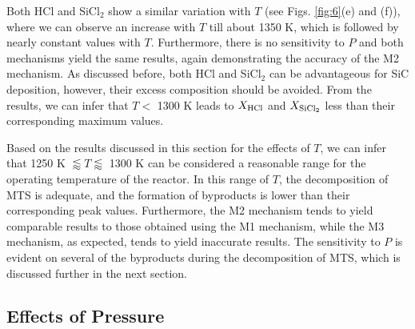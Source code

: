 \documentclass[final, letterpaper, square, comma, numbers, sort&compress]{elsarticle}
\begin{document}
Both HCl and SiCl$_2$ show a similar variation with $T$ (see Figs. \ref{fig:6}(e) and (f)), where we can observe an increase with $T$ till about 1350 K, which is followed by nearly constant values with $T$. Furthermore, there is no sensitivity to $P$ and both mechanisms yield the same results, again demonstrating the accuracy of the M2 mechanism. As discussed before, both HCl and SiCl$_2$ can be advantageous for SiC deposition, however, their excess composition should be avoided. From the results, we can infer that $T <$ 1300 K leads to $X_{\rm HCl}$ and $X_{\rm SiCl_2}$ less than their corresponding maximum values.

Based on the results discussed in this section for the effects of $T$, we can infer that 1250 K $\lessapprox T \lessapprox$ 1300 K can be considered a reasonable range for the operating temperature of the reactor. In this range of $T$, the decomposition of MTS is adequate, and the formation of byproducts is lower than their corresponding peak values. Furthermore, the M2 mechanism tends to yield comparable results to those obtained using the M1 mechanism, while the M3 mechanism, as expected, tends to yield inaccurate results. The sensitivity to $P$ is evident on several of the byproducts during the decomposition of MTS, which is discussed further in the next section.

\subsection{Effects of Pressure}
\label{S:4.2}
\end{document}
